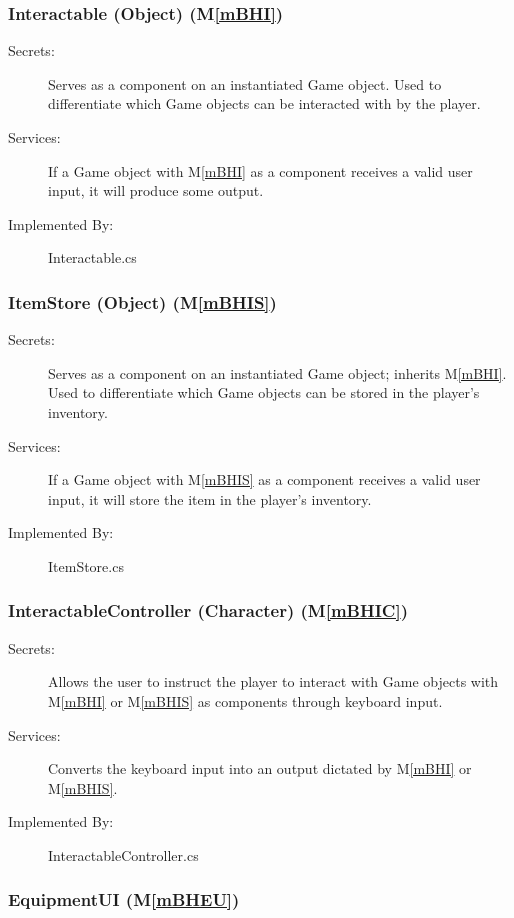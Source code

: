 \documentclass[12pt, titlepage]{article}
\newcommand{\mref}[1]{M\ref{#1}}
\begin{document}
\subsubsection{Interactable (Object) (\mref{mBHI})}

\begin{description}
\item[Secrets:] Serves as a component on an instantiated Game object. Used to differentiate which Game objects can be interacted with by the player.
\item[Services:] If a Game object with \mref{mBHI} as a component receives a valid user input, it will produce some output. 
\item[Implemented By:] Interactable.cs
\end{description}

\subsubsection{ItemStore (Object) (\mref{mBHIS})}

\begin{description}
\item[Secrets:] Serves as a component on an instantiated Game object; inherits \mref{mBHI}. Used to differentiate which Game objects can be stored in the player's inventory.
\item[Services:] If a Game object with \mref{mBHIS} as a component receives a valid user input, it will store the item in the player's inventory.
\item[Implemented By:] ItemStore.cs
\end{description}

\subsubsection{InteractableController (Character)  (\mref{mBHIC})}

\begin{description}
\item[Secrets:] Allows the user to instruct the player to interact with Game objects with \mref{mBHI} or \mref{mBHIS} as components through keyboard input.
\item[Services:] Converts the keyboard input into an output dictated by \mref{mBHI} or \mref{mBHIS}.
\item[Implemented By:] InteractableController.cs
\end{description}

\subsubsection{EquipmentUI (\mref{mBHEU})}
\end{document}
